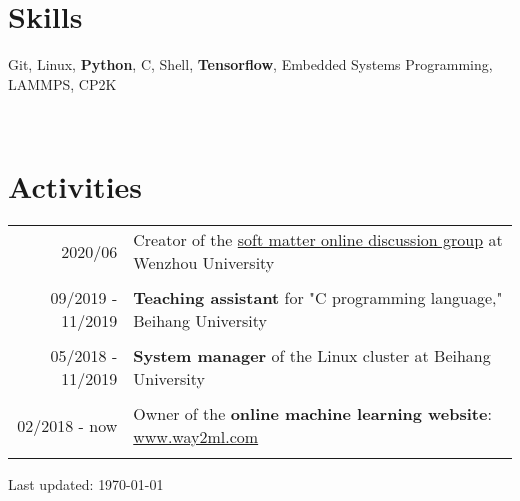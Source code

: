 \documentclass[a4paper,10pt]{article} %
\begin{document}
\section{Skills}
\begin{small}
Git, Linux, \textbf{Python}, C, Shell, \textbf{Tensorflow}, Embedded Systems Programming, LAMMPS, CP2K
\end{small}
\\

\section{Activities}
\begin{tabular}{r|l}	
	2020/06                        & Creator of the \href{https://github.com/HuangJiaLian/SoftMatterDiscuss}{soft matter online discussion group} at Wenzhou University\\
	\multicolumn{2}{c}{} \\	%
	
	09/2019 - 11/2019                     & \textbf{Teaching assistant }for  "C programming language," Beihang University \\   	
	\multicolumn{2}{c}{} \\	%
	
	05/2018 - 11/2019                     & \textbf{System manager} of the Linux cluster at Beihang University\\
	\multicolumn{2}{c}{} \\	%
	
	02/2018 - now                     & Owner of the \textbf{online machine learning website}: \href{www.way2ml.com}{www.way2ml.com} \\
	\multicolumn{2}{c}{} \\	%
\end{tabular}

\begin{flushright} 
Last updated: {\today}
\end{flushright}
\end{document}
